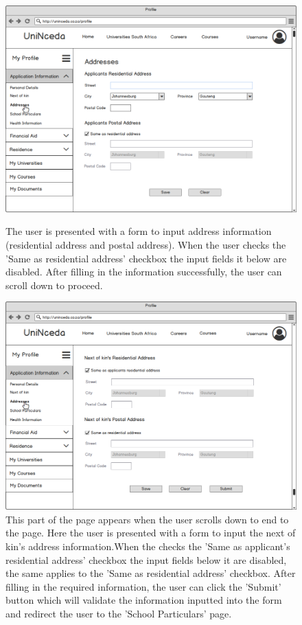 \documentclass[a4paper, 12pt]{article}
\begin{document}
\begin{figure}[H]
\centering
\includegraphics[scale=0.35]{ProfileAppInfoAddresses}
\caption{The user is presented with a form to input address information (residential address and postal address). When the user checks the 'Same as residential address' checkbox the input fields it below are disabled. After filling in the information successfully, the user can scroll down to proceed.}
\label{ProfileAppInfoAddresses}

\vspace{1cm}

\includegraphics[scale=0.35]{ProfileAppInfoAddressesPage2}
\caption{This part of the page appears when the user scrolls down to end to the page. Here the user is presented with a form to input the next of kin's address information.When the checks the 'Same as applicant's residential address' checkbox the input fields below it are disabled, the same applies to the 'Same as residential address' checkbox. After filling in the required information, the user can click the 'Submit' button which will validate the information inputted into the form and redirect the user to the 'School Particulars' page. }
\label{ProfileAppInfoAddressesPage2)}
\end{figure}
\end{document}
